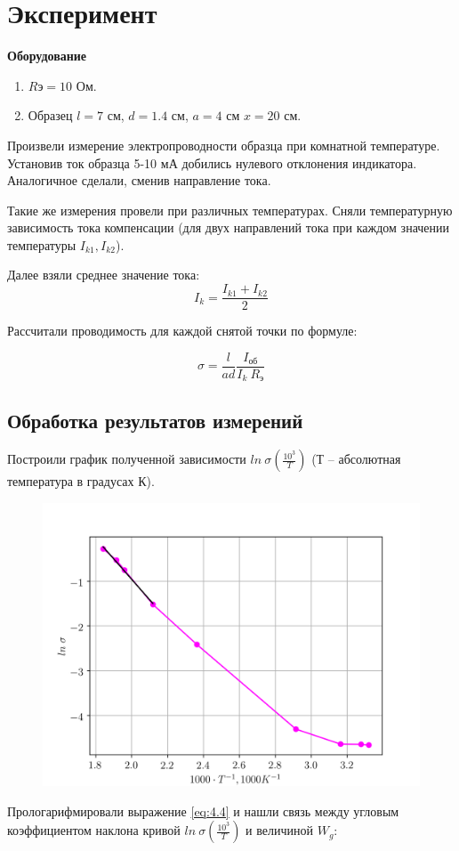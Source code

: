 \section*{Эксперимент}
\textbf{Оборудование}
\begin{enumerate}
	\item $R{\text{э}} = 10$ Ом.
	\item Образец $l = 7$ см, $d=1.4$ см, $a = 4$ см $x = 20$ см.
\end{enumerate}

Произвели измерение электропроводности образца при комнатной температуре. Установив ток образца 5-10 мА
добились нулевого отклонения индикатора. Аналогичное сделали, сменив направление тока.

Такие же измерения провели при различных температурах. Сняли температурную зависимость тока компенсации (для двух направлений тока при каждом
значении температуры $I_{k1},I_{k2}$).

Далее взяли среднее значение тока:
$$I_k=\frac{I_{k1}+I_{k2}}{2}$$

Рассчитали проводимость для каждой снятой точки по формуле:

$$\sigma = \frac{l}{ad} \frac{I_{\text{об}}}{ I_k ~ R_{\text{э}}}$$



\subsection*{Обработка результатов измерений}
Построили график полученной зависимости $ln~\sigma(\frac{10^3}{T})$ (Т – абсолютная температура в градусах К).

\begin{figure}[h!]
	\centering
	\includegraphics[width = .8\linewidth]{graphs/lns.png}
	\caption{}
	\label{fig:exp.1}
\end{figure}
Прологарифмировали выражение \eqref{eq:4.4} и нашли связь между угловым коэффициентом наклона кривой
$ln~\sigma(\frac{10^3}{T})$ и величиной $W_g$:

